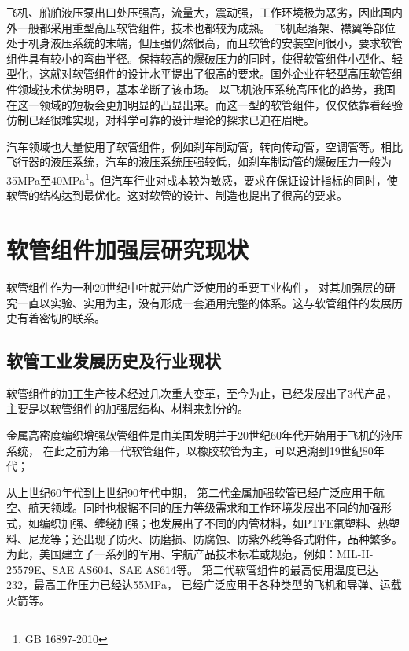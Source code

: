 飞机、船舶液压泵出口处压强高，流量大，震动强，工作环境极为恶劣，因此国内外一般都采用重型高压软管组件，技术也都较为成熟。
飞机起落架、襟翼等部位处于机身液压系统的末端，但压强仍然很高，而且软管的安装空间很小，要求软管组件具有较小的弯曲半径。保持较高的爆破压力的同时，使得软管组件小型化、轻型化，这就对软管组件的设计水平提出了很高的要求。国外企业在轻型高压软管组件领域技术优势明显，基本垄断了该市场。
以飞机液压系统高压化的趋势，我国在这一领域的短板会更加明显的凸显出来。而这一型的软管组件，仅仅依靠看经验仿制已经很难实现，对科学可靠的设计理论的探求已迫在眉睫。

汽车领域也大量使用了软管组件，例如刹车制动管，转向传动管，空调管等。相比飞行器的液压系统，汽车的液压系统压强较低，如刹车制动管的爆破压力一般为35MPa至40MPa\footnote{GB 16897-2010}。但汽车行业对成本较为敏感，要求在保证设计指标的同时，使软管的结构达到最优化。这对软管的设计、制造也提出了很高的要求。

 	 	 
\section{软管组件加强层研究现状}		



软管组件作为一种20世纪中叶就开始广泛使用的重要工业构件，
对其加强层的研究一直以实验、实用为主，没有形成一套通用完整的体系。这与软管组件的发展历史有着密切的联系。


\subsection{软管工业发展历史及行业现状}

软管组件的加工生产技术经过几次重大变革，至今为止，已经发展出了3代产品，主要是以软管组件的加强层结构、材料来划分的。

金属高密度编织增强软管组件是由美国发明并于20世纪60年代开始用于飞机的液压系统，
在此之前为第一代软管组件，以橡胶软管为主，可以追溯到19世纪80年代\cite{Breig1988}；

从上世纪60年代到上世纪90年代中期，
第二代金属加强软管已经广泛应用于航空、航天领域。同时也根据不同的压力等级需求和工作环境发展出不同的加强形式，如编织加强、缠绕加强；也发展出了不同的内管材料，如PTFE氟塑料、热塑料、尼龙等；还出现了防火、防磨损、防腐蚀、防紫外线等各式附件，品种繁多。
为此，美国建立了一系列的军用、宇航产品技术标准或规范，例如：MIL-H-25579E、SAE AS604、SAE AS614等。
第二代软管组件的最高使用温度已达232\textcelsius，最高工作压力已经达55MPa，
已经广泛应用于各种类型的飞机和导弹、运载火箭等。

